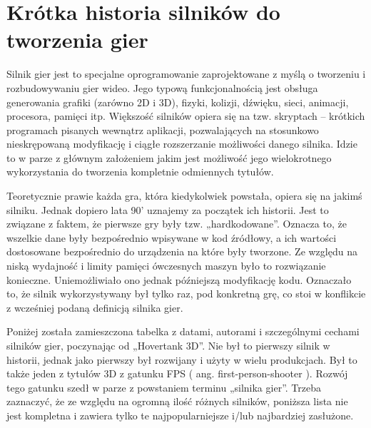 \documentclass[openright]{xmgr}
\begin{document}
\chapter{Krótka historia silników do tworzenia gier}

Silnik gier jest to specjalne oprogramowanie zaprojektowane z myślą o tworzeniu i rozbudowywaniu gier wideo. Jego typową funkcjonalnością jest obsługa generowania grafiki (zarówno 2D i 3D), fizyki, kolizji, dźwięku, sieci, animacji, procesora, pamięci itp. Większość silników opiera się na tzw. skryptach – krótkich programach pisanych wewnątrz aplikacji, pozwalających na stosunkowo nieskrępowaną modyfikację i ciągłe rozszerzanie możliwości danego silnika. Idzie to w parze z głównym założeniem jakim jest możliwość jego wielokrotnego wykorzystania do tworzenia kompletnie odmiennych tytułów.

Teoretycznie prawie każda gra, która kiedykolwiek powstała, opiera się na jakimś silniku. Jednak dopiero lata 90' uznajemy za początek ich historii. Jest to związane z faktem, że pierwsze gry były tzw. „hardkodowane”. Oznacza to, że wszelkie dane były bezpośrednio wpisywane w kod źródłowy, a ich wartości dostosowane bezpośrednio do urządzenia na które były tworzone. Ze względu na niską wydajność i limity pamięci ówczesnych maszyn było to rozwiązanie konieczne. Uniemożliwiało ono jednak późniejszą modyfikację kodu. Oznaczało to, że silnik wykorzystywany był tylko raz, pod konkretną grę, co stoi w konflikcie z wcześniej podaną definicją silnika gier.

Poniżej została zamieszczona tabelka z datami, autorami i szczególnymi cechami silników gier, poczynając od „Hovertank 3D”. Nie był to pierwszy silnik w historii, jednak jako pierwszy był rozwijany i użyty w wielu produkcjach. Był to także jeden z tytułów 3D z gatunku FPS ( ang. first-person-shooter ). Rozwój tego gatunku szedł w parze z powstaniem terminu „silnika gier”. Trzeba zaznaczyć, że ze względu na ogromną ilość różnych silników, poniższa lista nie jest kompletna i zawiera tylko te najpopularniejsze i/lub najbardziej zasłużone.
\end{document}

